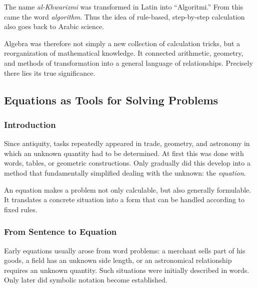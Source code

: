 \begin{DidacticBox}
	\label{box:origin}
	The name \emph{al-Khwarizmi} was transformed in Latin into ``Algoritmi.''
	From this came the word \emph{algorithm}.
	Thus the idea of rule-based, step-by-step calculation
	also goes back to Arabic science.
\end{DidacticBox}

Algebra was therefore not simply a new collection of calculation tricks,
but a reorganization of mathematical knowledge.
It connected arithmetic, geometry, and methods of transformation
into a general language of relationships.
Precisely there lies its true significance.


\subsection{Equations as Tools for Solving Problems}
\label{sec:3.2_equations}

\subsubsection*{Introduction}
Since antiquity, tasks repeatedly appeared in trade,
geometry, and astronomy
in which an unknown quantity
had to be determined.
At first this was done with words, tables, or geometric constructions.
Only gradually did this develop into a method
that fundamentally simplified dealing with the unknown:
the \emph{equation}.

An equation makes a problem not only calculable,
but also generally formulable.
It translates a concrete situation into a form
that can be handled according to fixed rules.

\subsubsection*{From Sentence to Equation}
Early equations usually arose from word problems:
a merchant sells part of his goods,
a field has an unknown side length,
or an astronomical relationship requires an unknown quantity.
Such situations were initially described in words.
Only later did symbolic notation become established.

